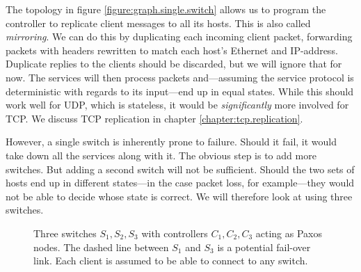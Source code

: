 The topology in figure \vref{figure:graph.single.switch} allows us to
program the controller to replicate client messages to all its hosts.
This is also called \textit{mirroring}.
%
We can do this by duplicating each incoming client packet,
forwarding packets with headers rewritten to match each
host's Ethernet and IP-address.  Duplicate replies to the clients should be
discarded, but we will ignore that for now.
%
The services will then process packets and---assuming the service protocol
is deterministic with regards to its input---end up in equal states.
%
While this should work well for \acs{UDP}, which is
stateless, it would be \textit{significantly} more involved
for \acs{TCP}.  We discuss TCP replication in chapter
\vref{chapter:tcp.replication}.

However, a single switch is inherently prone to failure.  Should it fail, it
would take down all the services along with it.
%
The obvious step is to add more switches.
%
But adding a second switch will not be sufficient.  Should the two sets of
hosts end up in different states---in the case packet loss, for
example---they would not be able to decide whose state is correct.
%
We will therefore look at using three switches.

\begin{figure}[H]
  \centering
  \caption{Three switches $S_1, S_2, S_3$ with controllers $C_1, C_2, C_3$ acting as Paxos nodes.
           The dashed line between $S_1$ and $S_3$ is a potential fail-over
             link.  Each client is assumed to be able to connect to any
             switch.}
  \label{figure:graph.three.switches}
\end{figure}

